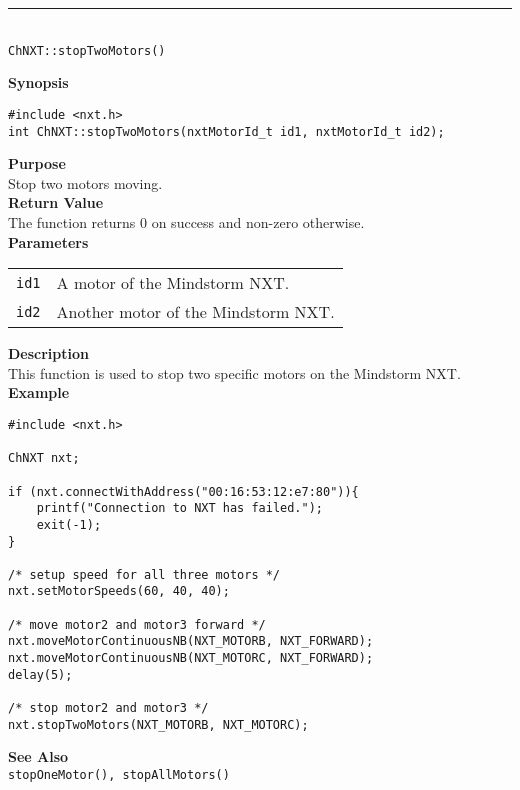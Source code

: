 \noindent
\vspace{5pt}
\rule{4.5in}{0.015in}\\
\noindent
{\LARGE \texttt{ChNXT::stopTwoMotors()} }\\


\noindent
{\bf Synopsis}
\begin{lstlisting}
#include <nxt.h>
int ChNXT::stopTwoMotors(nxtMotorId_t id1, nxtMotorId_t id2);
\end{lstlisting}

\noindent
{\bf Purpose}\\
Stop two motors moving.\\

\noindent
{\bf Return Value}\\
The function returns 0 on success and non-zero otherwise.\\

\noindent
{\bf Parameters}\\
\vspace{-0.1in}
\begin{description}
\item
\begin{tabular}{ p{20mm}p{135mm} }
\texttt{id1}       &A motor of the Mindstorm NXT.\\
\texttt{id2}      &Another motor of the Mindstorm NXT.\\
\end{tabular}
\end{description}

\noindent
{\bf Description}\\
This function is used to stop two specific motors on the Mindstorm NXT.\\

\noindent
{\bf Example}
\begin{lstlisting}
#include <nxt.h> 

ChNXT nxt;

if (nxt.connectWithAddress("00:16:53:12:e7:80")){
    printf("Connection to NXT has failed.");
    exit(-1);
}
    
/* setup speed for all three motors */
nxt.setMotorSpeeds(60, 40, 40);

/* move motor2 and motor3 forward */
nxt.moveMotorContinuousNB(NXT_MOTORB, NXT_FORWARD);
nxt.moveMotorContinuousNB(NXT_MOTORC, NXT_FORWARD);
delay(5);

/* stop motor2 and motor3 */
nxt.stopTwoMotors(NXT_MOTORB, NXT_MOTORC);
\end{lstlisting}

\noindent
{\bf See Also}\\
\texttt{stopOneMotor(), stopAllMotors()}\\
